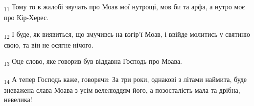 \begin{tcolorbox}
\textsubscript{11} Тому то в жалобі звучать про Моав мої нутрощі, мов би та арфа, а нутро моє про Кір-Херес.
\end{tcolorbox}
\begin{tcolorbox}
\textsubscript{12} І буде, як виявиться, що змучивсь на взгір'ї Моав, і ввійде молитись у святиню свою, та він не осягне нічого.
\end{tcolorbox}
\begin{tcolorbox}
\textsubscript{13} Оце слово, яке говорив був віддавна Господь про Моава.
\end{tcolorbox}
\begin{tcolorbox}
\textsubscript{14} А тепер Господь каже, говорячи: За три роки, однакові з літами наймита, буде зневажена слава Моава з усім велелюддям його, а позосталість мала та дрібна, невелика!
\end{tcolorbox}
